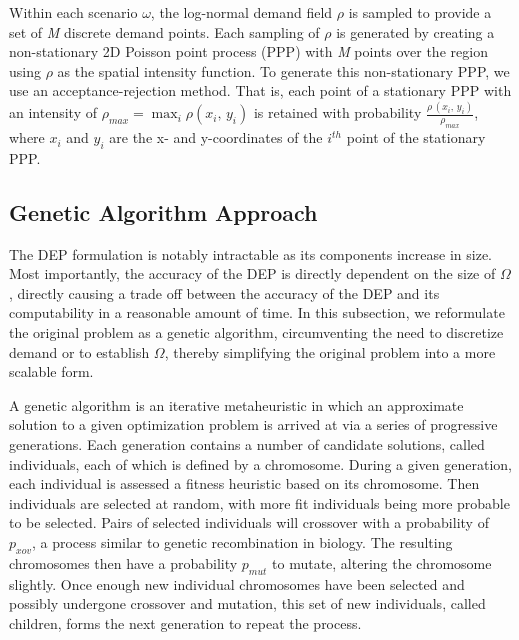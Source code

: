 \documentclass[onecolumn,draftcls]{IEEEtran}
\begin{document}
Within each scenario $\omega$, the log-normal demand field $\rho$ is sampled to provide a set of \textit{M} discrete demand points.  Each sampling of $\rho$ is generated by creating a non-stationary 2D Poisson point process (PPP) with \textit{M} points over the region using $\rho$ as the spatial intensity function.  To generate this non-stationary PPP, we use an acceptance-rejection method.  That is, each point of a stationary PPP with an intensity of $\rho_{max} = \max_i\rho\left(x_i,\, y_i\right)$ is retained with probability $\frac{\rho\,\left(x_i,\, y_i\right)}{\rho_{max}}$, where $x_i$ and $y_i$ are the x- and y-coordinates of the $i^{th}$ point of the stationary PPP.


\subsection{Genetic Algorithm Approach} \label{ga}
The DEP formulation is notably intractable as its components increase in size.  Most importantly, the accuracy of the DEP is directly dependent on the size of $\Omega$, directly causing a trade off between the accuracy of the DEP and its computability in a reasonable amount of time.  In this subsection, we reformulate the original problem as a genetic algorithm, circumventing the need to discretize demand or to establish $\Omega$, thereby simplifying the original problem into a more scalable form.

A genetic algorithm is an iterative metaheuristic in which an approximate solution to a given optimization problem is arrived at via a series of progressive generations.  Each generation contains a number of candidate solutions, called individuals, each of which is defined by a chromosome.  During a given generation, each individual is assessed a fitness heuristic based on its chromosome.  Then individuals are selected at random, with more fit individuals being more probable to be selected.  Pairs of selected individuals will crossover with a probability of $p_{xov}$, a process similar to genetic recombination in biology.  The resulting chromosomes then have a probability $p_{mut}$ to mutate, altering the chromosome slightly.  Once enough new individual chromosomes have been selected and possibly undergone crossover and mutation, this set of new individuals, called children, forms the next generation to repeat the process.  %
\end{document}
